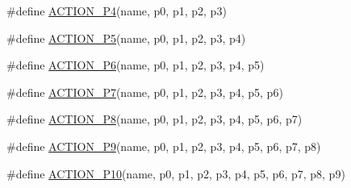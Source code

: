 \begin{DoxyCompactItemize}
\item 
\#define \mbox{\hyperlink{_obj__test_2lib_2googletest-release-1_88_81_2googlemock_2include_2gmock_2gmock-generated-actions_8h_af416cf9b0288fce8b2c4b71e4df6cfc0}{A\+C\+T\+I\+O\+N\+\_\+\+P4}}(name,  p0,  p1,  p2,  p3)
\item 
\#define \mbox{\hyperlink{_obj__test_2lib_2googletest-release-1_88_81_2googlemock_2include_2gmock_2gmock-generated-actions_8h_ad0bb4c20795e7efe55b9b76f334554b2}{A\+C\+T\+I\+O\+N\+\_\+\+P5}}(name,  p0,  p1,  p2,  p3,  p4)
\item 
\#define \mbox{\hyperlink{_obj__test_2lib_2googletest-release-1_88_81_2googlemock_2include_2gmock_2gmock-generated-actions_8h_a3a8af72f23167873fcd5fc7476a4fabc}{A\+C\+T\+I\+O\+N\+\_\+\+P6}}(name,  p0,  p1,  p2,  p3,  p4,  p5)
\item 
\#define \mbox{\hyperlink{_obj__test_2lib_2googletest-release-1_88_81_2googlemock_2include_2gmock_2gmock-generated-actions_8h_a82d96846bae4fee8432385fd24b0a7ee}{A\+C\+T\+I\+O\+N\+\_\+\+P7}}(name,  p0,  p1,  p2,  p3,  p4,  p5,  p6)
\item 
\#define \mbox{\hyperlink{_obj__test_2lib_2googletest-release-1_88_81_2googlemock_2include_2gmock_2gmock-generated-actions_8h_a150147ecae8b84107be8575e4b2560cc}{A\+C\+T\+I\+O\+N\+\_\+\+P8}}(name,  p0,  p1,  p2,  p3,  p4,  p5,  p6,  p7)
\item 
\#define \mbox{\hyperlink{_obj__test_2lib_2googletest-release-1_88_81_2googlemock_2include_2gmock_2gmock-generated-actions_8h_a6a38804f2dce3fa758335676b4c26cda}{A\+C\+T\+I\+O\+N\+\_\+\+P9}}(name,  p0,  p1,  p2,  p3,  p4,  p5,  p6,  p7,  p8)
\item 
\#define \mbox{\hyperlink{_obj__test_2lib_2googletest-release-1_88_81_2googlemock_2include_2gmock_2gmock-generated-actions_8h_aff3ff3b23965dd03539aa4cbc5181002}{A\+C\+T\+I\+O\+N\+\_\+\+P10}}(name,  p0,  p1,  p2,  p3,  p4,  p5,  p6,  p7,  p8,  p9)
\end{DoxyCompactItemize}
